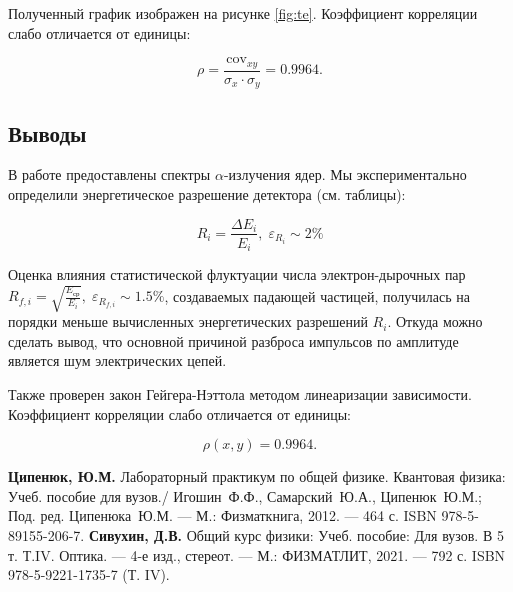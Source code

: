 \documentclass[10pt,a4paper]{article}
\begin{document}
\begin{multicols}{2}
	Полученный график изображен на рисунке \ref{fig:te}. Коэффициент корреляции слабо отличается от единицы: 
	
	$$ \rho = \frac{ \text{cov}_{ xy } }{ \sigma_x \cdot \sigma_y} = 0.9964. $$
	
	\subsection*{Выводы}
	
	В работе предоставлены спектры $\alpha$-излучения ядер. Мы экспериментально определили энергетическое разрешение детектора (см. таблицы):
	
	$$R_i = \frac{\Delta E_i}{E_i},\; \varepsilon_{R_i} \sim 2 \%$$

	Оценка влияния статистической флуктуации числа электрон-дырочных пар $R_{f,i} = \sqrt{\frac{E_{\text{ср}}}{E_i}}, \; \varepsilon_{R_{f,i}} \sim 1.5 \%$, создаваемых падающей частицей, получилась на порядки меньше вычисленных энергетических разрешений $R_i$. Откуда можно сделать вывод, что основной причиной разброса импульсов по амплитуде является шум электрических цепей.
	
	
	Также проверен закон Гейгера-Нэттола методом линеаризации зависимости. Коэффициент корреляции слабо отличается от единицы: 
	
	$$ \rho (x,y) = 0.9964. $$
	
	
	
	\begin{thebibliography}{}
		 \textbf{Ципенюк, Ю.М.} Лабораторный практикум по общей физике. Квантовая физика: Учеб. пособие для вузов./ Игошин~Ф.Ф., Самарский~Ю.А., Ципенюк~Ю.М.; Под. ред. Ципенюка~Ю.М. --- М.: Физматкнига, 2012. --- 464 с. ISBN 978-5-89155-206-7.
		 \textbf{Сивухин, Д.В.} Общий курс физики: Учеб. пособие: Для вузов. В 5 т. Т.IV. Оптика. --- 4-е изд., стереот. --- М.: ФИЗМАТЛИТ, 2021. --- 792 с. ISBN 978-5-9221-1735-7 (Т. IV).
	\end{thebibliography}
\end{multicols}
\end{document}
